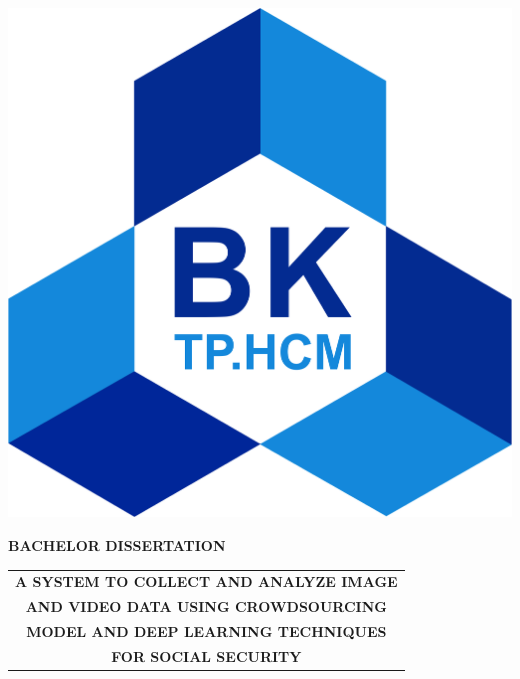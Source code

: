 \begin{titlepage}
\vspace{0.4cm}
\begin{center}
\includegraphics[scale=0.35]{hcmut.png}\\[1cm]
\end{center}
\vspace{-0.75cm}
\begin{center}
\large 
	\bfseries BACHELOR DISSERTATION \\
\end{center}
\vspace{-1.25cm}
\begin{center}
\Large
	\begin{tabular}{@{}c}
		\bfseries{A SYSTEM TO COLLECT AND ANALYZE IMAGE}\\ 
		\bfseries{AND VIDEO DATA USING CROWDSOURCING} \\		
		\bfseries{MODEL AND DEEP LEARNING TECHNIQUES} \\
		\bfseries{ FOR SOCIAL SECURITY} \\[0.5cm]
	\end{tabular}
\end{center}
	

\end{titlepage}
